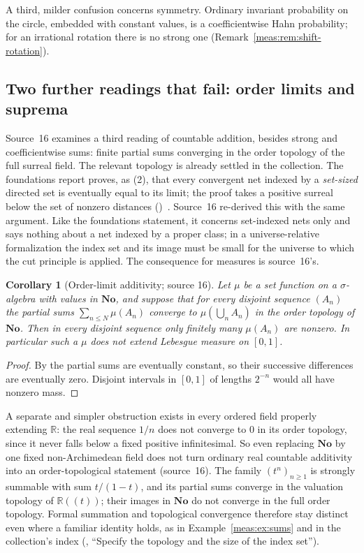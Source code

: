 \documentclass[11pt]{article}
\numberwithin{equation}{section}
\newtheorem{corollary}[theorem]{Corollary}
\theoremstyle{definition}
\theoremstyle{remark}
\newcommand{\R}{\mathbb R}
\newcommand{\No}{\mathbf{No}}
\begin{document}
A third, milder confusion concerns symmetry. Ordinary invariant probability
on the circle, embedded with constant values, is a coefficientwise Hahn
probability; for an irrational rotation there is no strong one
(Remark~\ref{meas:rem:shift-rotation}).

\subsection{Two further readings that fail: order limits and suprema}
\label{meas:cw:sub:orderlimits}

Source~16 examines a third reading of countable addition, besides strong and
coefficientwise sums: finite partial sums converging in the order topology of
the full surreal field. The relevant topology is already settled in the
collection. The foundations report proves, as (2),
that every convergent net indexed by a \emph{set-sized} directed set is
eventually equal to its limit; the proof takes a positive surreal below the set
of nonzero distances ()~\cite{repofound}. Source~16
re-derived this with the same argument. Like the foundations statement, it
concerns set-indexed nets only and says nothing about a net indexed by a proper
class; in a universe-relative formalization the index set and its image must be
small for the universe to which the cut principle is applied. The consequence
for measures is source~16's.

\begin{corollary}[Order-limit additivity; source 16]\label{meas:cw:cor:orderlimits}
Let $\mu$ be a set function on a $\sigma$-algebra with values in $\No$, and
suppose that for every disjoint sequence $(A_n)$ the partial sums
$\sum_{n\le N}\mu(A_n)$ converge to $\mu(\bigcup_nA_n)$ in the order topology of
$\No$. Then in every disjoint sequence only finitely many $\mu(A_n)$ are
nonzero. In particular such a $\mu$ does not extend Lebesgue measure on
$[0,1]$.
\end{corollary}
\begin{proof}
By  the partial sums are eventually constant, so their
successive differences are eventually zero. Disjoint intervals in $[0,1]$ of
lengths $2^{-n}$ would all have nonzero mass.
\end{proof}

A separate and simpler obstruction exists in every ordered field properly
extending $\R$: the real sequence $1/n$ does not converge to $0$ in its order
topology, since it never falls below a fixed positive infinitesimal. So even
replacing $\No$ by one fixed non-Archimedean field does not turn ordinary real
countable additivity into an order-topological statement (source~16). The
family $(t^n)_{n\ge1}$ is strongly summable with sum $t/(1-t)$, and its partial
sums converge in the valuation topology of $\R((t))$; their images in $\No$ do
not converge in the full order topology. Formal summation and topological
convergence therefore stay distinct even where a familiar identity holds, as in
Example~\ref{meas:ex:sums} and in the collection's index (,
``Specify the topology and the size of the index set'').
\end{document}
